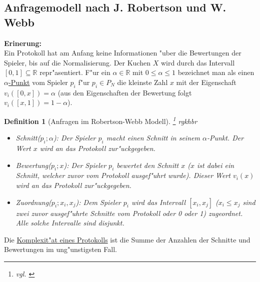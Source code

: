\documentclass[11pt, a4paper, twoside]{article}
\newcommand{\wf}{\color{white}}
\newcommand{\tf}{\color{black}}
\newtheorem{defi}[satz]{Definition}
\numberwithin{equation}{section}
\begin{document}
\subsection{Anfragemodell nach J. Robertson und W. Webb}
\textbf{Erinerung:}\\
Ein Protokoll hat am Anfang keine Informationen "uber die Bewertungen der Spieler, bis auf die Normalisierung. Der Kuchen $X$ wird durch das Intervall $[0,1]\subseteq \mathbb{R}$ repr"asentiert. F"ur ein $\alpha \in \mathbb{R}$ mit $0 \leq \alpha \leq 1$ bezeichnet man als einen \underline{$\alpha$-Punkt} vom Spieler $p_i$ f"ur $p_i \in P_N$ die kleinste Zahl $x$ mit der Eigenschaft $v_i([0,x])=\alpha$ (aus den Eigenschaften der Bewertung folgt $v_i([x,1])=1-\alpha$).
\begin{defi}[Anfragen im Robertson-Webb Modell]\footnote{vgl. \cite{50}} \wf rgkhbr \tf \\
\begin{itemize}
\item Schnitt($p_i;\alpha$): Der Spieler $p_i$ macht einen Schnitt in seinem $\alpha$-Punkt. Der Wert $x$ wird an das Protokoll zur"uckgegeben.\\
\item Bewertung($p_i;x$): Der Spieler $p_i$ bewertet den Schnitt $x$ ($x$ ist dabei ein Schnitt, welcher zuvor vom Protokoll ausgef"uhrt wurde). Dieser Wert $v_i(x)$ wird an das Protokoll zur"uckgegeben.\\
\item Zuordnung($p_i;x_i,x_j$): Dem Spieler $p_i$ wird das Intervall $[x_i,x_j]$ ($x_i \leq x_j$ sind zwei zuvor ausgef"uhrte Schnitte vom Protokoll oder 0 oder 1) zugeordnet. Alle solche Intervalle sind disjunkt.
\end{itemize}  
\end{defi}
Die \underline{Komplexit"at eines Protokolls} ist die Summe der Anzahlen der Schnitte und Bewertungen im ung"unstigsten Fall.\newpage
\end{document}
